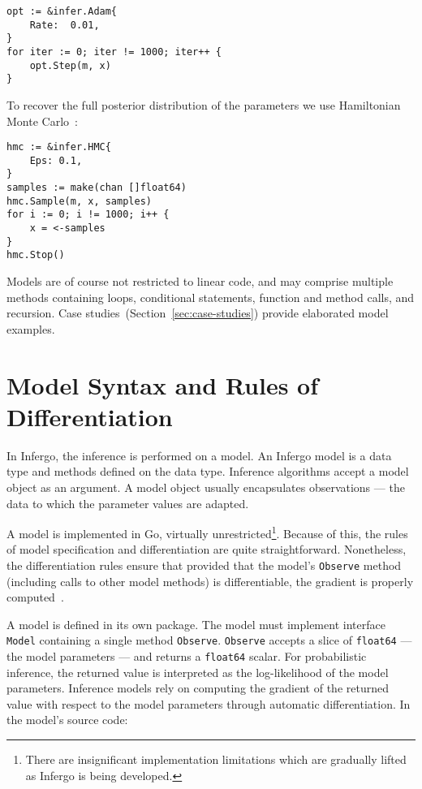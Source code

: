 \documentclass[sigplan,review,10pt,anonymous]{acmart}
\begin{document}
\begin{sloppypar}
\begin{lstlisting}
opt := &infer.Adam{
    Rate:  0.01,
}
for iter := 0; iter != 1000; iter++ {
    opt.Step(m, x)
}
\end{lstlisting}

To recover the full posterior distribution of
the parameters we use Hamiltonian Monte Carlo~\cite{N12}:

\begin{lstlisting}
hmc := &infer.HMC{
	Eps: 0.1,
}
samples := make(chan []float64)
hmc.Sample(m, x, samples)
for i := 0; i != 1000; i++ {
	x = <-samples
}
hmc.Stop()
\end{lstlisting}

Models are of course not restricted to linear code, and may
comprise multiple methods containing loops, conditional
statements, function and method calls, and recursion. Case
studies~(Section~\ref{sec:case-studies}) provide elaborated
model examples.

\section{Model Syntax and Rules of Differentiation}

In Infergo, the inference is performed on a model. An Infergo
model is a data type and methods defined on the data type.
Inference algorithms accept a model object as an argument.
A model object usually encapsulates observations --- the data 
to which the parameter values are adapted.

A model is implemented in Go, virtually
unrestricted\footnote{There are insignificant implementation
limitations which are gradually lifted as Infergo is being
developed.}. Because of this, the rules of model specification
and differentiation are quite straightforward. Nonetheless, the
differentiation rules ensure that provided that the model's
\lstinline{Observe} method (including calls to other model methods)
is differentiable, the gradient is properly computed~\cite{GW08}.

A model is defined in its own package. The model must
implement interface \lstinline{Model} containing a single method
\lstinline{Observe}. \lstinline{Observe} accepts a slice of
\lstinline{float64} --- the model parameters --- and returns a
\lstinline{float64} scalar. For probabilistic inference, the
returned value is interpreted as the log-likelihood of the model
parameters. Inference models rely on computing the gradient of
the returned value with respect to the model parameters through
automatic differentiation. In the model's source code:


\end{sloppypar}
\end{document}
